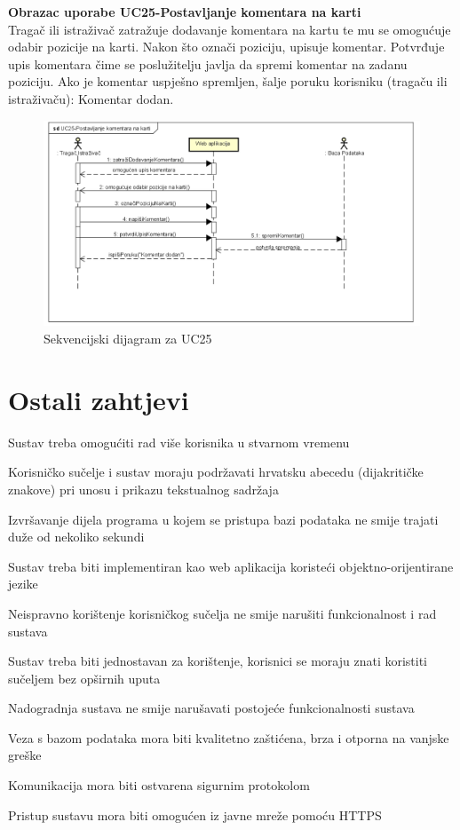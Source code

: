 	
				\textbf{Obrazac uporabe UC25-Postavljanje komentara na karti}\\
				
				Tragač ili istraživač zatražuje dodavanje komentara na kartu te mu se omogućuje odabir pozicije na karti. Nakon što označi poziciju, upisuje komentar. Potvrđuje upis komentara čime se poslužitelju javlja da spremi komentar na zadanu poziciju. Ako je komentar uspješno spremljen, šalje poruku korisniku (tragaču ili istraživaču): Komentar dodan.
				\begin{figure}[H]
					\includegraphics[width=\textwidth]{slike/UC25-PostavljanjeKomentaraNaKarti.png} %
					\caption{Sekvencijski dijagram za UC25}
					\label{fig:promjene2} %
				\end{figure}
				\eject
				
				
		\section{Ostali zahtjevi}
			 
			 \begin{packed_item}
			 	\item Sustav treba omogućiti rad više korisnika u stvarnom vremenu
			 	\item Korisničko sučelje i sustav moraju podržavati hrvatsku abecedu (dijakritičke znakove) pri unosu i prikazu tekstualnog sadržaja
			 	\item Izvršavanje dijela programa u kojem se pristupa bazi podataka ne smije trajati duže od nekoliko sekundi
			 	\item Sustav treba biti implementiran kao web aplikacija koristeći objektno-orijentirane jezike
			 	\item Neispravno korištenje korisničkog sučelja ne smije narušiti funkcionalnost i rad sustava
			 	\item Sustav treba biti jednostavan za korištenje, korisnici se moraju znati koristiti sučeljem bez opširnih uputa 
			 	\item Nadogradnja sustava ne smije narušavati postojeće funkcionalnosti sustava
			 	\item Veza s bazom podataka mora biti kvalitetno zaštićena, brza i otporna na vanjske greške
			 	\item Komunikacija mora biti ostvarena sigurnim protokolom
			 	\item Pristup sustavu mora biti omogućen iz javne mreže pomoću HTTPS
			 \end{packed_item}
			 
			 
			 
	